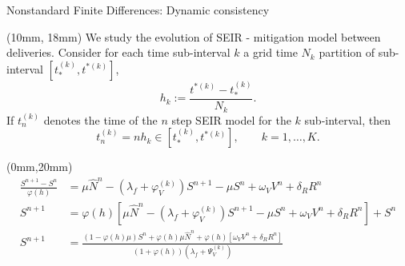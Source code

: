 \begin{frame}{Nonstandard Finite Differences: Dynamic consistency}
    \begin{textblock*}{120mm}(10mm, 18mm)
        We study the evolution of SEIR - mitigation model between
        deliveries.%
    Consider for each time sub-interval $k$  a grid time $N_k$ partition of
    sub-interval $[t_{*}^{(k)},t^{*(k)}]$,
    $$
        h_k:= \frac{t^{*(k)} - t_{*}^{(k)}}{N_k}.
    $$
    If $t_n^{(k)}$ denotes the time of the $n$ step SEIR model for the
    $k$ sub-interval, then
    $$
        t_n^{(k)} =
            n h_k \in [t_{*}^{(k)},t^{*(k)}],
            \qquad k = 1,\dots,
            K.
    $$
    \end{textblock*}
\end{frame}
\begin{frame}{}
    \begin{textblock*}{120mm}(0mm,20mm)
            \begin{align*}
                \frac{S^{n+1} - S^n}{\varphi(h)}
                    &= \mu \widehat{N}^n
                    - (\lambda_f + \varphi_V^{(k)}) S^{n+1}
                    - \mu S^n + \omega_V V^n + \delta_R R^n
                    \\
                S^{n+1} &=
                    \varphi(h)[
                        \mu \widehat{N}^n
                        - (\lambda_f +  \varphi_V^{(k)}) S^{n+1}
                        - \mu S^n + \omega_V V^n + \delta_R R^n
                    ] + S^n
                    \\
                S^{n+1} &=
                    \frac{
                        (1-\varphi(h) \mu) S^n
                        + \varphi(h)\mu \widehat{N}^n
                        + \varphi(h)[
                            \omega_V V^n
                            + \delta_R R^n
                        ]}{
                                (1 + \varphi(h))
                                (\lambda_f + \Psi_V^{(k)})
                    }
            \end{align*}
    \end{textblock*}
\end{frame}
